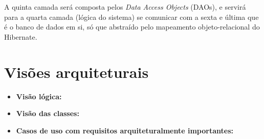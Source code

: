 \documentclass[11pt, a4paper]{article}
\begin{document}
        A quinta camada será composta pelos \textit{Data Access Objects} (DAOs),
        e servirá para a quarta camada (lógica do sistema) se comunicar com a
        sexta e última que é o banco de dados em si, só que abstraído pelo
        mapeamento objeto-relacional do Hibernate.

    \section{Visões arquiteturais}
        \begin{itemize}
            \item \textbf{Visão lógica:} %
            
            \item \textbf{Visão das classes:} %
            
            \item \textbf{Casos de uso com requisitos arquiteturalmente
            importantes:} %
        \end{itemize}
\end{document}
